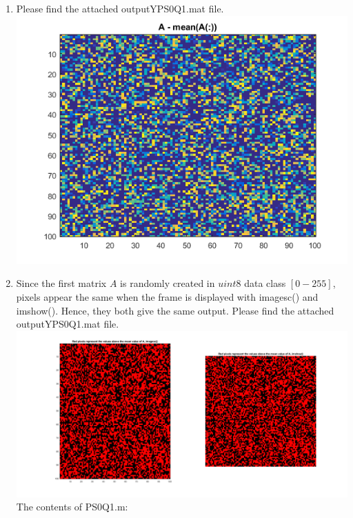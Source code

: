 \documentclass[man]{apa6}
\begin{document}
\begin{enumerate}
\begin{enumerate}
				\item Please find the attached outputYPS0Q1.mat file.
					\includegraphics[width=\linewidth]{plots/1-A-4/d.png}
					
				\item Since the first matrix $A$ is randomly created in $uint8$ data class $[0-255]$, pixels appear the same when the frame is displayed with imagesc() and imshow(). Hence, they both give the same output. Please find the attached outputYPS0Q1.mat file.
					\includegraphics[width=\linewidth]{plots/1-A-4/e.png}
				The contents of PS0Q1.m: \\
				
			\end{enumerate}
		
	\end{enumerate}
\end{document}
